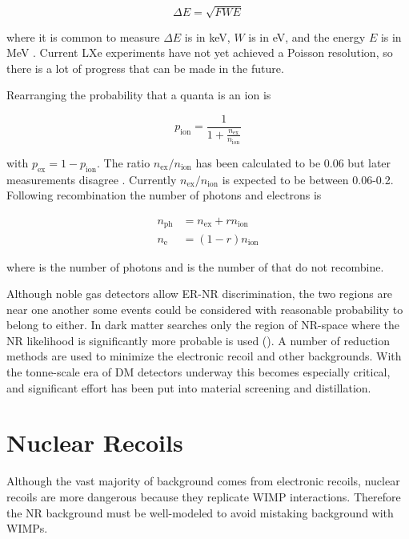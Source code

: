 \begin{equation}
\Delta E = \sqrt{F W E}
\end{equation}

\noindent where it is common to measure $\Delta E$ is in keV, $W$ is in eV, and the energy $E$ is in MeV .  Current
LXe experiments have not yet achieved a Poisson resolution, so there is a lot of progress that can be made in the future.

Rearranging  the probability that a quanta is an ion is

\begin{equation}
p_{\mathrm{ion}} = \frac{1}{1 + \frac{ n_{\mathrm{ex}} }{ n_{\mathrm{ion}} }}
\end{equation}

\noindent with $p_{\mathrm{ex}} = 1 - p_{\mathrm{ion}}$.  The ratio $n_{\mathrm{ex}} / n_{\mathrm{ion}}$ has been calculated to be
0.06 
but later measurements disagree .  Currently $n_{\mathrm{ex}} / n_{\mathrm{ion}}$ is expected to be
between 0.06-0.2.  Following recombination the number of photons and electrons is

\begin{subequations}
\begin{align}
n_{\mathrm{ph}} &= n_{\mathrm{ex}} + rn_{\mathrm{ion}} \\
n_{\mathrm{e}} &= (1 - r)n_{\mathrm{ion}}
\end{align}
\end{subequations}

\noindent where \nphot is the number of photons and \nelect is the number of \electron that do not recombine.

Although noble gas detectors allow ER-NR discrimination, the two regions are near one another some events could
be considered with reasonable probability to belong to either.  In dark matter searches only the region of NR-space where the NR
likelihood is significantly more probable is used ().  A number of reduction methods are used to minimize
the electronic recoil and other backgrounds.  With the tonne-scale era of DM detectors
underway this becomes especially critical, and significant effort has been put into material screening and distillation.


\section{Nuclear Recoils}
\label{sec:nr}
Although the vast majority of background comes from electronic recoils, nuclear recoils are more dangerous because they replicate
WIMP interactions.  Therefore the NR background must be well-modeled to avoid mistaking background with WIMPs.

